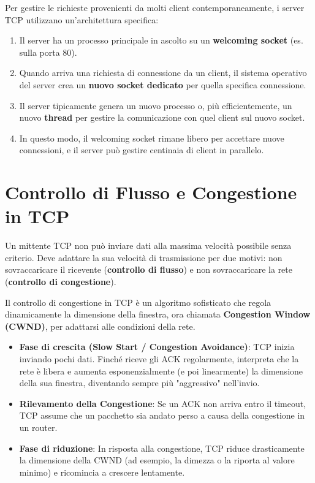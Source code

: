 Per gestire le richieste provenienti da molti client contemporaneamente, i server TCP utilizzano un'architettura specifica:
\begin{enumerate}
    \item Il server ha un processo principale in ascolto su un \textbf{welcoming socket} (es. sulla porta 80).
    \item Quando arriva una richiesta di connessione da un client, il sistema operativo del server crea un \textbf{nuovo socket dedicato} per quella specifica connessione.
    \item Il server tipicamente genera un nuovo processo o, più efficientemente, un nuovo \textbf{thread} per gestire la comunicazione con quel client sul nuovo socket.
    \item In questo modo, il welcoming socket rimane libero per accettare nuove connessioni, e il server può gestire centinaia di client in parallelo.
\end{enumerate}

\section{Controllo di Flusso e Congestione in TCP}
Un mittente TCP non può inviare dati alla massima velocità possibile senza criterio. Deve adattare la sua velocità di trasmissione per due motivi: non sovraccaricare il ricevente (\textbf{controllo di flusso}) e non sovraccaricare la rete (\textbf{controllo di congestione}).


Il controllo di congestione in TCP è un algoritmo sofisticato che regola dinamicamente la dimensione della finestra, ora chiamata \textbf{Congestion Window (CWND)}, per adattarsi alle condizioni della rete.
\begin{itemize}
    \item \textbf{Fase di crescita (Slow Start / Congestion Avoidance)}: TCP inizia inviando pochi dati. Finché riceve gli ACK regolarmente, interpreta che la rete è libera e aumenta esponenzialmente (e poi linearmente) la dimensione della sua finestra, diventando sempre più "aggressivo" nell'invio.
    \item \textbf{Rilevamento della Congestione}: Se un ACK non arriva entro il timeout, TCP assume che un pacchetto sia andato perso a causa della congestione in un router.
    \item \textbf{Fase di riduzione}: In risposta alla congestione, TCP riduce drasticamente la dimensione della CWND (ad esempio, la dimezza o la riporta al valore minimo) e ricomincia a crescere lentamente.
\end{itemize}

